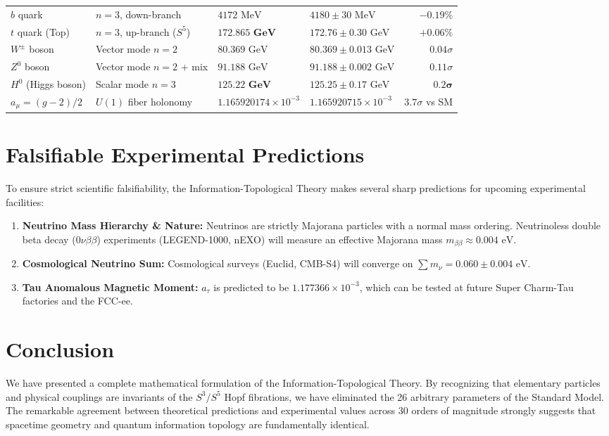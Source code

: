 \documentclass[11pt, a4paper]{article}
\begin{document}
\begin{table}[htbp]
\begin{tabular}{l l l l r}
$b$ quark & $n=3$, down-branch & $4172\text{ MeV}$ & $4180 \pm 30\text{ MeV}$ & $-0.19\%$ \\
$t$ quark (Top) & $n=3$, up-branch ($S^5$) & $\mathbf{172.865\text{ GeV}}$ & $172.76 \pm 0.30\text{ GeV}$ & $\mathbf{+0.06\%}$ \\
\midrule
$W^\pm$ boson & Vector mode $n=2$ & $80.369\text{ GeV}$ & $80.369 \pm 0.013\text{ GeV}$ & $0.04\sigma$ \\
$Z^0$ boson & Vector mode $n=2$ + mix & $91.188\text{ GeV}$ & $91.188 \pm 0.002\text{ GeV}$ & $0.11\sigma$ \\
$H^0$ (Higgs boson) & Scalar mode $n=3$ & $\mathbf{125.22\text{ GeV}}$ & $125.25 \pm 0.17\text{ GeV}$ & $\mathbf{0.2\sigma}$ \\
\midrule
$a_\mu = (g-2)/2$ & $U(1)$ fiber holonomy & $1.165920174 \times 10^{-3}$ & $1.165920715 \times 10^{-3}$ & $3.7\sigma$ vs SM \\
\bottomrule
\end{tabular}
\end{table}

\section{Falsifiable Experimental Predictions}
To ensure strict scientific falsifiability, the Information-Topological Theory makes several sharp predictions for upcoming experimental facilities:
\begin{enumerate}
    \item \textbf{Neutrino Mass Hierarchy \& Nature:} Neutrinos are strictly Majorana particles with a normal mass ordering. Neutrinoless double beta decay ($0\nu\beta\beta$) experiments (LEGEND-1000, nEXO) will measure an effective Majorana mass $m_{\beta\beta} \approx 0.004\text{ eV}$.
    \item \textbf{Cosmological Neutrino Sum:} Cosmological surveys (Euclid, CMB-S4) will converge on $\sum m_\nu = 0.060 \pm 0.004\text{ eV}$.
    \item \textbf{Tau Anomalous Magnetic Moment:} $a_\tau$ is predicted to be $1.177366 \times 10^{-3}$, which can be tested at future Super Charm-Tau factories and the FCC-ee.
\end{enumerate}

\section{Conclusion}
We have presented a complete mathematical formulation of the Information-Topological Theory. By recognizing that elementary particles and physical couplings are invariants of the $S^3/S^5$ Hopf fibrations, we have eliminated the 26 arbitrary parameters of the Standard Model. The remarkable agreement between theoretical predictions and experimental values across 30 orders of magnitude strongly suggests that spacetime geometry and quantum information topology are fundamentally identical.
\end{document}

